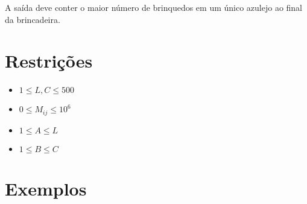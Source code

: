 A saída deve conter o maior número de brinquedos em um único azulejo ao final da brincadeira.


\section*{Restrições}

\begin{itemize}
\item $1 \leq L, C \leq 500$
\item $0 \leq M_{ij} \leq 10^6$
\item $1 \leq A \leq L$
\item $1 \leq B \leq C$
\end{itemize}


\section*{Exemplos}

\exemplo

